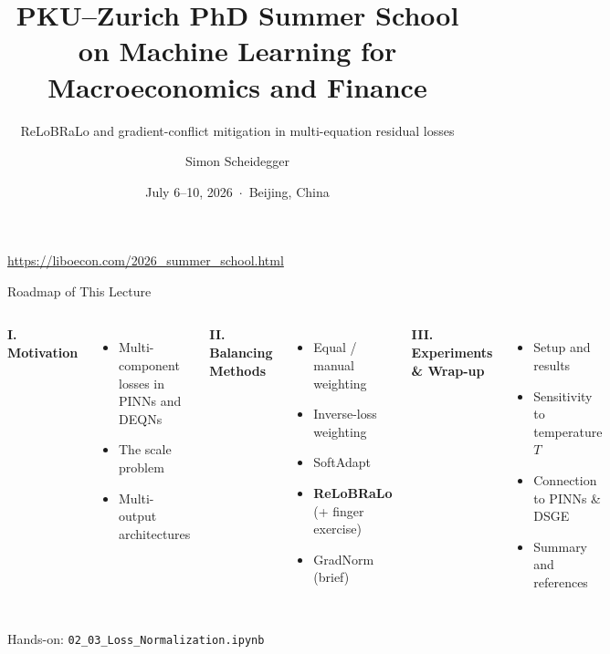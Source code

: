 \documentclass[aspectratio=169,11pt]{beamer}
\title[PKU--Zurich Summer School 2026]
{PKU--Zurich PhD Summer School on Machine Learning for Macroeconomics and Finance}
\subtitle{ReLoBRaLo and gradient-conflict mitigation in multi-equation residual losses}
\author{Simon Scheidegger}
\institute{HEC Lausanne $\cdot$ University of Zurich}
\date{July 6--10, 2026 \,$\cdot$\, Beijing, China}
\begin{document}
\newcommand{\exercisepause}{%
  \tikz[baseline=(X.base)]{\node[fill=darkgreen!80!black, text=white,
  rounded corners=2pt, inner sep=3pt, font=\scriptsize\bfseries](X){PAUSE --- 5 min};}}



{
\begin{frame}
\titlepage
\vspace{-0.4cm}
\begin{center}
{\footnotesize \url{https://liboecon.com/2026_summer_school.html}}
\end{center}
\end{frame}
}

\begin{frame}{Roadmap of This Lecture}
\begin{columns}[T]
\textbf{I. Motivation}
\begin{itemize}
    \item Multi-component losses in PINNs and DEQNs
    \item The scale problem
    \item Multi-output architectures
\end{itemize}

\vspace{0.4em}
\textbf{II. Balancing Methods}
\begin{itemize}
    \item Equal / manual weighting
    \item Inverse-loss weighting
    \item SoftAdapt
    \item \textbf{ReLoBRaLo} (+ finger exercise)
    \item GradNorm (brief)
\end{itemize}

\textbf{III. Experiments \& Wrap-up}
\begin{itemize}
    \item Setup and results
    \item Sensitivity to temperature $T$
    \item Connection to PINNs \& DSGE
    \item Summary and references
\end{itemize}
\end{columns}

\vspace{0.2em}
\begin{center}
{\scriptsize Hands-on: \texttt{02\_03\_Loss\_Normalization.ipynb}}
\end{center}
\end{frame}
\end{document}
